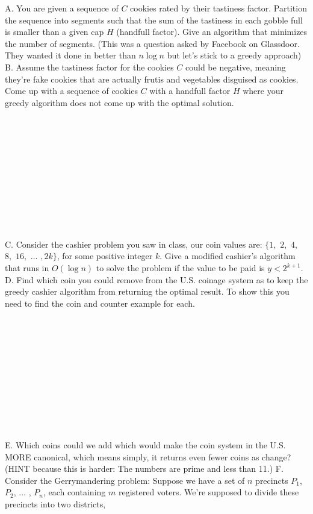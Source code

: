 \documentclass[12pt]{article}
\begin{document}
\noindent A. You are given a sequence of $C$ cookies rated by their tastiness factor. Partition the sequence into segments such that the sum of the tastiness in each gobble full is smaller than a given cap $H$ (handfull factor). Give an algorithm that minimizes the number of segments. (This was a question asked by Facebook on Glassdoor. They wanted it done in better than $n \log{n}$ but let's stick to a greedy approach)
\newpage \noindent B. Assume the tastiness factor for the cookies $C$ could be negative, meaning they're fake cookies that are actually frutis and vegetables disguised as cookies. Come up with a sequence of cookies $C$ with a handfull factor $H$ where your greedy algorithm does not come up with the optimal solution.\\\\\\\\\\\\\\\\\\\\\\\\
C. Consider the cashier problem you saw in class, our coin values are:
$\{1,$ $2,$ $4,$ $8,$ $16,$ $\dots$ $,2k\}$, for some positive integer $k$. Give a modified cashier's algorithm that runs in $O(\log{n})$
to solve the problem if the value to be paid is $y < 2^{k+1}$.
\newpage
\noindent D. Find which coin you could remove from the U.S. coinage system as to keep the greedy cashier algorithm
from returning the optimal result. To show this you need to find the coin and counter example for each.\\\\\\\\\\\\\\\\\\\\\\\\
E. Which coins could we add which would make the coin system in the U.S. MORE canonical, which means simply, it returns even fewer coins as change? (HINT because this is harder:
The numbers are prime and less than 11.)
\newpage
\noindent F. Consider the Gerrymandering problem: Suppose we have a set of $n$ precincts $P_1$, $P_2$, $\dots$ , $P_n$,
each containing $m$ registered voters. We’re supposed to divide these precincts into two districts,
\end{document}

